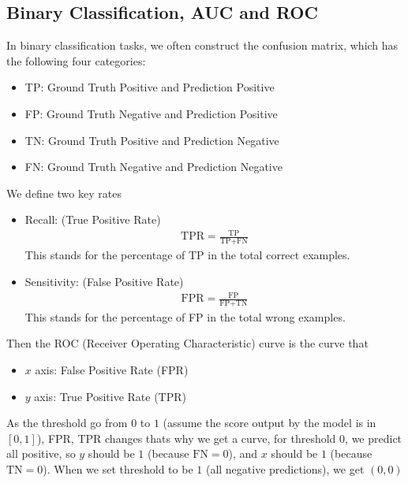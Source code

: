 \documentclass[11pt]{article}  %
\begin{document}
\subsection{Binary Classification, AUC and ROC}
In binary classification tasks, we often construct the confusion matrix, which has the following four categories:
\begin{itemize}
  \item TP: Ground Truth Positive and Prediction Positive
  \item FP: Ground Truth Negative and Prediction Positive
  \item TN: Ground Truth Positive and Prediction Negative
  \item FN: Ground Truth Negative and Prediction Negative
\end{itemize}
We define two key rates 
\begin{itemize}
  \item Recall: (True Positive Rate) 
  \begin{align*}
    \text{TPR} = \frac{\text{TP}}{\text{TP} + \text{FN}}
  \end{align*}
  This stands for the percentage of TP in the total correct examples.

  \item Sensitivity: (False Positive Rate)
  \begin{align*}
    \text{FPR} = \frac{\text{FP}}{\text{FP} + \text{TN}}
  \end{align*}
  This stands for the percentage of FP in the total wrong examples.
\end{itemize}

Then the ROC (Receiver Operating Characteristic) curve is the curve that 
\begin{itemize}
  \item $x$ axis: False Positive Rate (FPR)
  \item $y$ axis: True Positive Rate (TPR)
\end{itemize}
As the threshold go from $0$ to $1$ (assume the score output by the model is in $[0, 1]$), FPR, TPR changes thats why we get a curve, for threshold $0$, we predict all positive, so $y$ should be $1$ (because $\text{FN} = 0$), and $x$ should be $1$ (because $\text{TN} = 0$). 
When we set threshold to be $1$ (all negative predictions), we get $(0, 0)$
\end{document}
